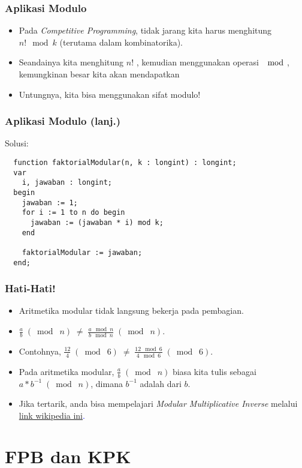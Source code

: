 \begin{frame}[fragile]
\frametitle{Aplikasi Modulo}
\begin{itemize}
  \item Pada \textit{Competitive Programming}, tidak jarang kita harus menghitung $n! \mod k$ (terutama dalam kombinatorika). 
  \item Seandainya kita menghitung $n!$ , kemudian menggunakan operasi $\mod$, kemungkinan besar kita akan mendapatkan 
  \item Untungnya, kita bisa menggunakan sifat modulo!
\end{itemize}
\end{frame}

\begin{frame}[fragile]
\frametitle{Aplikasi Modulo (lanj.)}
Solusi: 
\begin{lstlisting}
  function faktorialModular(n, k : longint) : longint;
  var
    i, jawaban : longint;
  begin
    jawaban := 1;
    for i := 1 to n do begin
      jawaban := (jawaban * i) mod k;
    end

    faktorialModular := jawaban;
  end;  
\end{lstlisting}
\end{frame}

\begin{frame}
\frametitle{Hati-Hati!}
\begin{itemize}
  \item Aritmetika modular tidak langsung bekerja pada pembagian.
  \item $\frac{a}{b} \; (\bmod\; n) \; \neq \; \frac{a \mod n}{b \mod n} \; (\bmod\; n)$.
  \item Contohnya, $\frac{12}{4} \; (\bmod\; 6) \; \neq \; \frac{12 \mod 6}{4 \mod 6} \; (\bmod\; 6)$.
  \item Pada aritmetika modular, $\frac{a}{b} \; (\bmod\; n)$ biasa kita tulis sebagai $a * b^{-1}\;(\bmod\; n)$, dimana $b^{-1}$ adalah 
       dari $b$.
  \item Jika tertarik, anda bisa mempelajari \textit{Modular Multiplicative Inverse} melalui \textcolor{blue}{\href{https://en.wikipedia.org/wiki/  Modular_multiplicative_inverse}{link wikipedia ini}.} 
\end{itemize}
\end{frame}

\section{FPB dan KPK}
\frame{\sectionpage}

